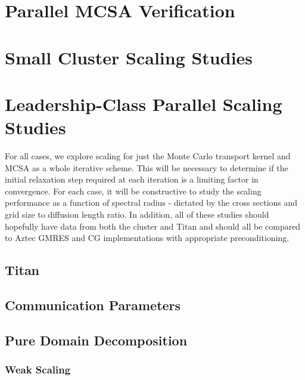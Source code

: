 \section{Parallel MCSA Verification}
\label{sec:parallel_verification}

\section{Small Cluster Scaling Studies}
\label{sec:small_scaling_studies}

\section{Leadership-Class Parallel Scaling Studies}
\label{sec:leadership_scaling_studies}
For all cases, we explore scaling for just the Monte Carlo transport
kernel and MCSA as a whole iterative scheme. This will be necessary to
determine if the initial relaxation step required at each iteration is
a limiting factor in convergence. For each case, it will be
constructive to study the scaling performance as a function of
spectral radius - dictated by the cross sections and grid size to
diffusion length ratio. In addition, all of these studies should
hopefully have data from both the cluster and Titan and should all be
compared to Aztec GMRES and CG implementations with appropriate
preconditioning.

\subsection{Titan}
\label{subsec:titan}

\subsection{Communication Parameters}
\label{subsec:comm_parameters}

\subsection{Pure Domain Decomposition}
\label{subsec:pure_domain_decomp}

\subsubsection{Weak Scaling}
\label{subsubsec:pure_weak}

